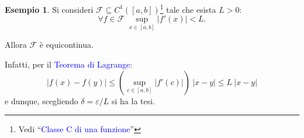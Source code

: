 \documentclass[10pt]{book}
\newcommand{\1}{\mathds{1}}
\theoremstyle{definition}%
\newtheorem{esempio}[thm]{Esempio}
\theoremstyle{plain}
\theoremstyle{remark}
\renewcommand{\href}[2]{\textcolor{blue}{#2}}
\begin{document}
\begin{esempio}
Si consideri \(\mathcal{F} \subseteq C^{1}\left([a,b]\right)\)\footnote{Vedi ``\href{../../../../../org/roam/20250113125602-classe_c_di_una_funzione.org}{Classe C di una funzione}''} tale che esista \(L>0\):
\begin{equation*}
\forall f \in \mathcal{F}\ \sup_{x \in [a,b]}|f'(x)|<L.
\end{equation*}

Allora \(\mathcal{F}\) è equicontinua.

Infatti, per il \href{../../../../../org/roam/20250629143200-teorema_di_lagrange.org}{Teorema di Lagrange}:
\begin{equation*}
|f(x)-f(y)|\le \left(\sup_{c \in [a,b]} |f'(c)|\right)\ |x-y| \le L\ |x-y|
\end{equation*}
e dunque, scegliendo \(\delta = \varepsilon/L\) si ha la tesi.
\end{esempio}
\end{document}
